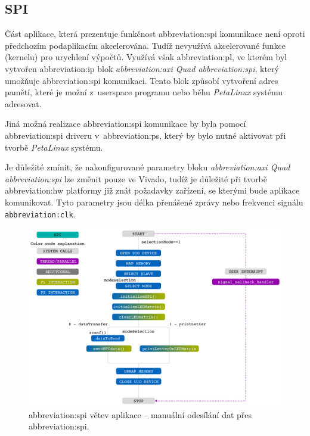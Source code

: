 \documentclass[a4paper, twoside, 11pt]{article}
\newcommand{\fbar}{\FloatBarrier}
\begin{document}
	   \fbar
	   \subsection{SPI}\label{subsec:spi}
	   Část aplikace, která prezentuje funkčnost \gls{abbreviation:spi} komunikace není oproti předchozím podaplikacím akcelerována. Tudíž nevyužívá akcelerované funkce (kernelu) pro urychlení výpočtů. Využívá však \gls{abbreviation:pl}, ve kterém byl vytvořen \gls{abbreviation:ip} blok \textit{\gls{abbreviation:axi} Quad \gls{abbreviation:spi}}, který umožňuje \gls{abbreviation:spi} komunikaci. Tento blok způsobí vytvoření adres pamětí, které je možní z~userspace programu nebo běhu \textit{PetaLinux} systému adresovat.\par
	   Jiná možná realizace \gls{abbreviation:spi} komunikace by byla pomocí \gls{abbreviation:spi} driveru v~\gls{abbreviation:ps}, který by bylo nutné aktivovat při tvorbě \textit{PetaLinux} systému.\par
	   Je důležité zmínit, že nakonfigurované parametry bloku \textit{\gls{abbreviation:axi} Quad \gls{abbreviation:spi}} lze změnit pouze ve Vivado, tudíž je důležité při tvorbě \gls{abbreviation:hw} platformy již znát požadavky zařízení, se kterými bude aplikace komunikovat. Tyto parametry jsou délka přenášené zprávy nebo frekvenci signálu \texttt{\gls{abbreviation:clk}}.\par
	   
	   \begin{figure}[htbp!]
			\centering
			\includegraphics[width=1\textwidth]{src/pdf/spi.pdf}
			\caption{\gls{abbreviation:spi} větev aplikace – manuální odesílání dat přes \gls{abbreviation:spi}.}
			\label{fig:spi}
	\end{figure}
\end{document}
